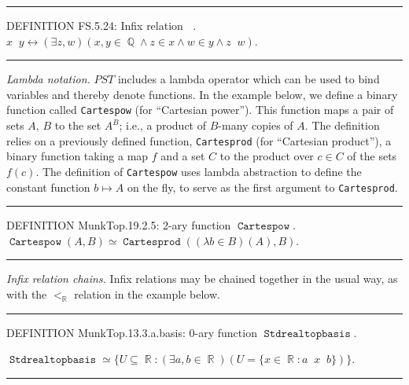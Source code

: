 \documentclass{llncs}
\newcommand{\myrule}{\noindent \rule{\textwidth}{0.3mm}}
\newcommand{\na}[1]{\mathit{#1}}    \newcommand{\fn}[1]{\mathit{#1}}    \newcommand{\ax}[1]{\mathit{(#1)}}  \newcommand{\mdl}[1]{\mathcal{#1}}
\begin{document}
\myrule

\noindent DEFINITION FS.5.24: Infix relation
$\mathop{\mathtt{<_{\mathbb{Q}}}}$. $x
\mathop{\mathtt{<_{\mathbb{Q}}}} y \leftrightarrow (\exists z,w)(x,y
\mathop{\mathtt{\in}} \mathop{\mathtt{\mathbb{Q}}} \wedge z
\mathop{\mathtt{\in}} x \wedge w \mathop{\mathtt{\in}} y \wedge z
\mathop{\mathtt{<_{SUB}}} w)$.

\myrule

\bigskip

\noindent \emph{Lambda notation.} $\na{PST}$ includes a lambda operator
which can be used to bind variables and thereby denote functions. In
the example below, we define a binary function called {\tt Cartespow}
(for ``Cartesian power''). This function maps a pair of sets $A$, $B$
to the set $A^B$; i.e., a product of $B$-many copies of $A$. The
definition relies on a previously defined function, {\tt Cartesprod}
(for ``Cartesian product''), a binary function taking a map $f$ and a
set $C$ to the product over $c \in C$ of the sets $f(c)$. The
definition of {\tt Cartespow} uses lambda abstraction to define the
constant function $b \mapsto A$ on the fly, to serve as the first
argument to {\tt Cartesprod}.

\medskip

\myrule

\noindent DEFINITION MunkTop.19.2.5: 2-ary function
$\mathop{\mathtt{Cartespow}}$. $\mathop{\mathtt{Cartespow}}(A,B) \simeq
\mathop{\mathtt{Cartesprod}}((\lambda b \mathop{\mathtt{\in}} B)(A),B)$.

\myrule

\bigskip

\noindent \emph{Infix relation chains.} Infix relations may be chained
together in the usual way, as with the $<_{\mathtt{\mathbb{R}}}$
relation in the example below.

\medskip

\myrule

\noindent DEFINITION MunkTop.13.3.a.basis: 0-ary function
$\mathop{\mathtt{Stdrealtopbasis}}$.

\noindent $\mathop{\mathtt{Stdrealtopbasis}} \simeq
\lbrace U \mathop{\mathtt{\subseteq}} \mathop{\mathtt{\mathbb{R}}} : (\exists
a,b \mathop{\mathtt{\in}} \mathop{\mathtt{\mathbb{R}}})(U = \lbrace x
\mathop{\mathtt{\in}} \mathop{\mathtt{\mathbb{R}}} : a \mathop{\mathtt{<_{\mathbb{R}}}} x
\mathop{\mathtt{<_{\mathbb{R}}}} b \rbrace ) \rbrace $.

\myrule

\bigskip
\end{document}
